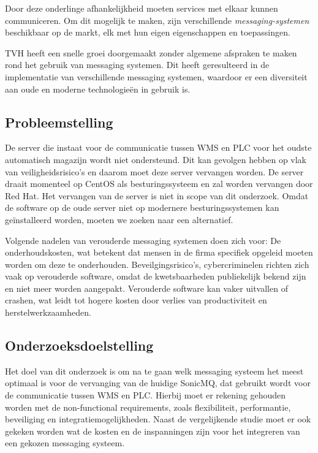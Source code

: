 Door deze onderlinge afhankelijkheid moeten services met elkaar kunnen communiceren. 
Om dit mogelijk te maken, zijn verschillende \emph{messaging-systemen} beschikbaar op de markt, 
elk met hun eigen eigenschappen en toepassingen.
\newline 

TVH heeft een snelle groei doorgemaakt zonder algemene afspraken te maken rond het gebruik van messaging systemen. 
Dit heeft geresulteerd in de implementatie van verschillende messaging systemen, waardoor er een diversiteit aan oude en moderne technologieën in gebruik is. 
\newline 
\newline
\newline

\subsection{Probleemstelling}
De server die instaat voor de communicatie tussen WMS en PLC voor het oudste automatisch magazijn wordt niet ondersteund.
Dit kan gevolgen hebben op vlak van veiligheidsrisico's en daarom moet deze server vervangen worden.
De server draait momenteel op CentOS als besturingssysteem en zal worden vervangen door Red Hat.
Het vervangen van de server is niet in scope van dit onderzoek. 
Omdat de software op de oude server niet op modernere besturingssystemen kan geïnstalleerd worden, 
moeten we zoeken naar een alternatief.
\newline

Volgende nadelen van verouderde messaging systemen doen zich voor: 
De onderhoudskosten, wat betekent dat mensen in de firma specifiek opgeleid moeten worden om deze te onderhouden. 
Beveilgingsrisico's, cybercriminelen richten zich vaak op verouderde software, omdat de kwetsbaarheden publiekelijk bekend zijn en niet meer worden aangepakt.
Verouderde software kan vaker uitvallen of crashen, wat leidt tot hogere kosten door verlies van productiviteit en herstelwerkzaamheden.
\newline 

\subsection{Onderzoeksdoelstelling}
Het doel van dit onderzoek is om na te gaan welk messaging systeem het meest optimaal is voor de vervanging van de huidige SonicMQ,
dat gebruikt wordt voor de communicatie tussen WMS en PLC. 
Hierbij moet er rekening gehouden worden met de non-functional requirements,
zoals flexibiliteit, performantie, beveiliging en integratiemogelijkheden.
Naast de vergelijkende studie moet er ook gekeken worden wat de kosten en de inspanningen zijn 
voor het integreren van een gekozen messaging systeem. \newline 

